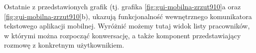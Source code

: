 Ostatnie z przedstawionych grafik (tj. grafika \ref{fig:gui-mobilna-zrzut910}a oraz \ref{fig:gui-mobilna-zrzut910}b), ukazują funkcjonalność wewnętrznego komunikatora tekstowego aplikacji mobilnej. Wyróżnić możemy tutaj widok listy pracowników, w którymi można rozpocząć konwersację, a także komponent przedstawiający rozmowę z konkretnym użytkownikiem.
